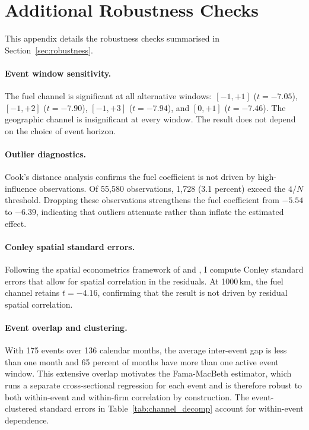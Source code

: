 \documentclass[12pt,a4paper]{article}
\begin{document}
\section{Additional Robustness Checks}\label{app:additional_robustness}

This appendix details the robustness checks summarised in Section~\ref{sec:robustness}.

\paragraph{Event window sensitivity.}
The fuel channel is significant at all alternative windows: $[-1, +1]$ ($t = -7.05$), $[-1, +2]$ ($t = -7.90$), $[-1, +3]$ ($t = -7.94$), and $[0, +1]$ ($t = -7.46$). The geographic channel is insignificant at every window. The result does not depend on the choice of event horizon.

\paragraph{Outlier diagnostics.}
Cook's distance analysis confirms the fuel coefficient is not driven by high-influence observations. Of 55{,}580 observations, 1{,}728 (3.1 percent) exceed the $4/N$ threshold. Dropping these observations strengthens the fuel coefficient from $-5.54$ to $-6.39$, indicating that outliers attenuate rather than inflate the estimated effect.

\paragraph{Conley spatial standard errors.}
Following the spatial econometrics framework of \citet{Anselin1988} and \citet{LeSagePace2009}, I compute Conley standard errors that allow for spatial correlation in the residuals. At 1000\,km, the fuel channel retains $t = -4.16$, confirming that the result is not driven by residual spatial correlation.

\paragraph{Event overlap and clustering.}
With 175 events over 136 calendar months, the average inter-event gap is less than one month and 65 percent of months have more than one active event window. This extensive overlap motivates the Fama-MacBeth estimator, which runs a separate cross-sectional regression for each event and is therefore robust to both within-event and within-firm correlation by construction. The event-clustered standard errors in Table~\ref{tab:channel_decomp} account for within-event dependence.
\end{document}
